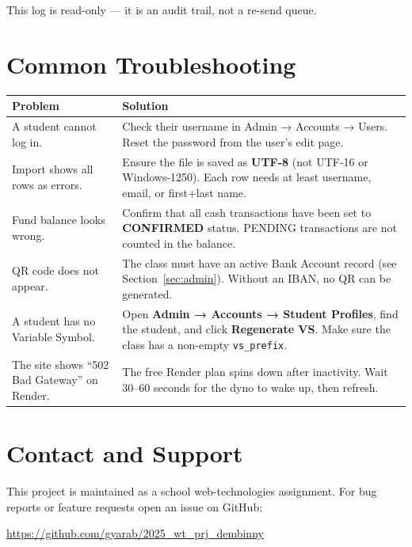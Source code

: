 \documentclass[a4paper,11pt]{article}
\begin{document}
\noindent
This log is read-only — it is an audit trail, not a re-send queue.

\section{Common Troubleshooting}

\begin{longtable}{p{5.5cm} p{8cm}}
\toprule
Problem & Solution \\
\midrule
\endhead
A student cannot log in.
    & Check their username in Admin → Accounts → Users.
      Reset the password from the user's edit page. \\
Import shows all rows as errors.
    & Ensure the file is saved as \textbf{UTF-8} (not UTF-16 or Windows-1250).
      Each row needs at least username, email, or first+last name. \\
Fund balance looks wrong.
    & Confirm that all cash transactions have been set to
      \textbf{CONFIRMED} status.
      PENDING transactions are not counted in the balance. \\
QR code does not appear.
    & The class must have an active Bank Account record (see Section~\ref{sec:admin}).
      Without an IBAN, no QR can be generated. \\
A student has no Variable Symbol.
    & Open \textbf{Admin → Accounts → Student Profiles}, find the student,
      and click \textbf{Regenerate VS}. Make sure the class has a
      non-empty \texttt{vs\_prefix}. \\
The site shows ``502 Bad Gateway'' on Render.
    & The free Render plan spins down after inactivity.
      Wait 30–60 seconds for the dyno to wake up, then refresh. \\
\bottomrule
\end{longtable}

\section{Contact and Support}

This project is maintained as a school web-technologies assignment.
For bug reports or feature requests open an issue on GitHub:

\begin{center}
    \url{https://github.com/gyarab/2025_wt_prj_dembinny}
\end{center}
\end{document}
